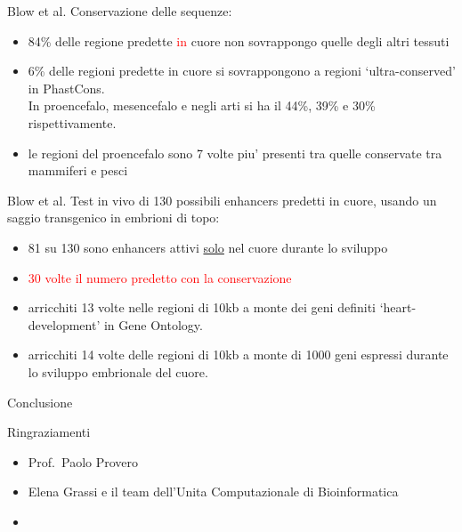 \documentclass{beamer}
\newcommand{\warn}[1]{\textcolor{red}{#1}}
\begin{document}
    \begin{frame}{Blow et al.}
        Conservazione delle sequenze:
        \begin{itemize}
            \item 84\% delle regione predette \warn{in} cuore non sovrappongo quelle degli altri tessuti
            \item 6\% delle regioni predette in cuore si sovrappongono a regioni `ultra-conserved'
            in PhastCons.\\
            In proencefalo, mesencefalo e negli arti si ha il 44\%, 39\% e 30\% rispettivamente.
            \item le regioni del proencefalo sono 7 volte piu' presenti tra quelle conservate
            tra mammiferi e pesci
        \end{itemize}
    \end{frame}


    \begin{frame}{Blow et al.}
        Test in vivo di 130 possibili enhancers predetti in cuore,
        usando un saggio transgenico in embrioni di topo:
        \begin{itemize}
            \item 81 su 130 sono enhancers attivi \underline{solo} nel cuore durante lo sviluppo
            \item \warn{30 volte il numero predetto con la conservazione}
            \item arricchiti 13 volte nelle regioni di 10kb a monte dei geni definiti
            `heart-development' in Gene Ontology.
            \item arricchiti 14 volte delle regioni di 10kb a monte di 1000 geni espressi
            durante lo sviluppo embrionale del cuore.
        \end{itemize}
    \end{frame}


    \begin{frame}{Conclusione}

    \end{frame}

    \begin{frame}{Ringraziamenti}
        \begin{itemize}
            \item Prof.\ Paolo Provero
            \item Elena Grassi e il team dell'Unita Computazionale di Bioinformatica
            \item {}
        \end{itemize}
    \end{frame}
\end{document}
